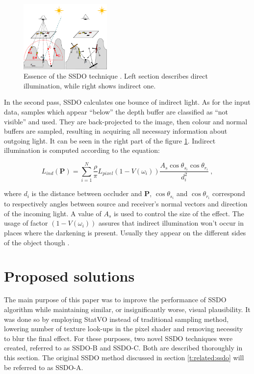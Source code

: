 \documentclass[10pt,journal,compsoc,twoside]{IEEEtran}
\begin{document}
	\begin{figure}[ht]
		\centering
		\includegraphics[width=0.4\textwidth]{fig_2_H.png}
		\caption{Essence of the SSDO technique \cite{ssdo}. Left section describes direct illumination, while right shows indirect one.}
		\label{fig:2_H}
	\end{figure}

	In the second pass, SSDO calculates one bounce of indirect light. As for the input data, samples which appear ``below'' the depth buffer are classified as ``not visible'' and used. They are back-projected to the image, then colour and normal buffers are sampled, resulting in acquiring all necessary information about outgoing light. It can be seen in the right part of the figure \ref{fig:2_H}. Indirect illumination is computed according to the equation:
	
	\begin{equation}
	L_{ind}(\mathbf{P}) = \sum_{i=1}^{N}\frac{\rho}{\pi}L_{pixel}(1 - V(\omega_{i}))\frac{A_{s}\cos\theta_{s_{i}}\cos\theta_{r_{i}}}{d_{i}^2} \ ,
	\end{equation}
	
	where \(d_{i}\) is the distance between occluder and \(\mathbf{P}\), \(\cos\theta_{s_{i}}\) and \(\cos\theta_{r_{i}}\) correspond to respectively angles between source and receiver's normal vectors and direction of the incoming light. A value of \(A_{s}\) is used to control the size of the effect. The usage of factor \((1 - V(\omega_{i}))\) assures that indirect illumination won't occur in places where the darkening is present. Usually they appear on the different sides of the object though \cite{ssdo}.
	
\section{Proposed solutions}\label{t:solutions}

The main purpose of this paper was to improve the performance of SSDO algorithm while maintaining similar, or insignificantly worse, visual plausibility. It was done so by employing StatVO instead of traditional sampling method, lowering number of texture look-ups in the pixel shader and removing necessity to blur the final effect. 
For these purposes, two novel SSDO techniques were created, referred to as SSDO-B and SSDO-C. Both are described thoroughly in this section. The original SSDO method discussed in section \ref{t:related:ssdo} will be referred to as SSDO-A.
	
\end{document}
